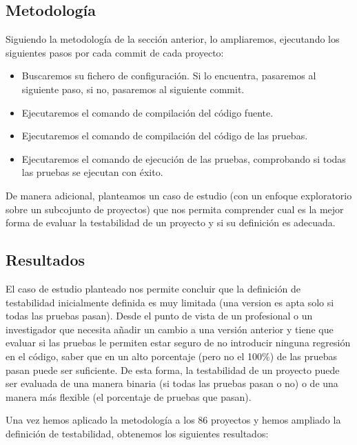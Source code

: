 \subsection{Metodología}

Siguiendo la metodología de la sección anterior, lo ampliaremos, ejecutando los siguientes pasos por cada commit de cada proyecto:

\begin{itemize}
    \item Buscaremos su fichero de configuración. Si lo encuentra, pasaremos al siguiente paso, si no, pasaremos al siguiente commit.
    \item Ejecutaremos el comando de compilación del código fuente.
    \item Ejecutaremos el comando de compilación del código de las pruebas.
    \item Ejecutaremos el comando de ejecución de las pruebas, comprobando si todas las pruebas se ejecutan con éxito.
\end{itemize}

De manera adicional, planteamos un caso de estudio (con un enfoque exploratorio sobre un subcojunto de proyectos) que nos permita comprender cual es la mejor forma de evaluar la testabilidad de un proyecto y si su definición es adecuada.

\subsection{Resultados}

El caso de estudio planteado nos permite concluir que la definición de testabilidad inicialmente definida es muy limitada (una version es apta solo si todas las pruebas pasan). 
Desde el punto de vista de un profesional o un investigador que necesita añadir un cambio a una versión anterior y tiene que evaluar si las pruebas le permiten estar seguro de no introducir ninguna regresión en el código, saber que en un alto porcentaje (pero no el 100\%) de las pruebas pasan puede ser suficiente.
De esta forma, la testabilidad de un proyecto puede ser evaluada de una manera binaria (si todas las pruebas pasan o no) o de una manera más flexible (el porcentaje de pruebas que pasan).

Una vez hemos aplicado la metodología a los 86 proyectos y hemos ampliado la definición de testabilidad, obtenemos los siguientes resultados:


